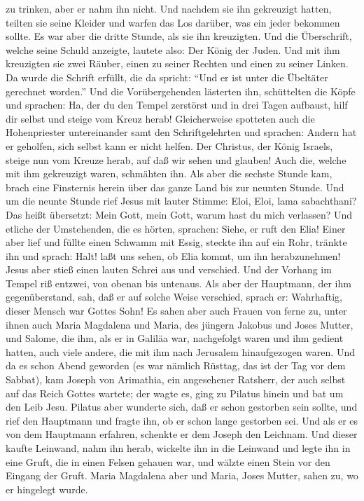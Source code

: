 zu trinken, aber er nahm ihn nicht.  Und nachdem sie ihn
gekreuzigt hatten, teilten sie seine Kleider und warfen das Los darüber,
was ein jeder bekommen sollte.  Es war aber die dritte
Stunde, als sie ihn kreuzigten.  Und die Überschrift,
welche seine Schuld anzeigte, lautete also: Der König der Juden.
 Und mit ihm kreuzigten sie zwei Räuber, einen zu seiner
Rechten und einen zu seiner Linken.  Da wurde die Schrift
erfüllt, die da spricht: ``Und er ist unter die Übeltäter gerechnet
worden.''  Und die Vorübergehenden lästerten ihn,
schüttelten die Köpfe und sprachen:  Ha, der du den
Tempel zerstörst und in drei Tagen aufbaust, hilf dir selbst und steige
vom Kreuz herab!  Gleicherweise spotteten auch die
Hohenpriester untereinander samt den Schriftgelehrten und sprachen:
Andern hat er geholfen, sich selbst kann er nicht helfen.
 Der Christus, der König Israels, steige nun vom Kreuze
herab, auf daß wir sehen und glauben! Auch die, welche mit ihm
gekreuzigt waren, schmähten ihn.  Als aber die sechste
Stunde kam, brach eine Finsternis herein über das ganze Land bis zur
neunten Stunde.  Und um die neunte Stunde rief Jesus mit
lauter Stimme: Eloi, Eloi, lama sabachthani? Das heißt übersetzt: Mein
Gott, mein Gott, warum hast du mich verlassen?  Und
etliche der Umstehenden, die es hörten, sprachen: Siehe, er ruft den
Elia!  Einer aber lief und füllte einen Schwamm mit
Essig, steckte ihn auf ein Rohr, tränkte ihn und sprach: Halt! laßt uns
sehen, ob Elia kommt, um ihn herabzunehmen!  Jesus aber
stieß einen lauten Schrei aus und verschied.  Und der
Vorhang im Tempel riß entzwei, von obenan bis untenaus. 
Als aber der Hauptmann, der ihm gegenüberstand, sah, daß er auf solche
Weise verschied, sprach er: Wahrhaftig, dieser Mensch war Gottes Sohn!
 Es sahen aber auch Frauen von ferne zu, unter ihnen auch
Maria Magdalena und Maria, des jüngern Jakobus und Joses Mutter, und
Salome,  die ihm, als er in Galiläa war, nachgefolgt
waren und ihm gedient hatten, auch viele andere, die mit ihm nach
Jerusalem hinaufgezogen waren.  Und da es schon Abend
geworden (es war nämlich Rüsttag, das ist der Tag vor dem Sabbat),
 kam Joseph von Arimathia, ein angesehener Ratsherr, der
auch selbst auf das Reich Gottes wartete; der wagte es, ging zu Pilatus
hinein und bat um den Leib Jesu.  Pilatus aber wunderte
sich, daß er schon gestorben sein sollte, und rief den Hauptmann und
fragte ihn, ob er schon lange gestorben sei.  Und als er
es von dem Hauptmann erfahren, schenkte er dem Joseph den Leichnam.
 Und dieser kaufte Leinwand, nahm ihn herab, wickelte ihn
in die Leinwand und legte ihn in eine Gruft, die in einen Felsen gehauen
war, und wälzte einen Stein vor den Eingang der Gruft. 
Maria Magdalena aber und Maria, Joses\textquotesingle{} Mutter, sahen
zu, wo er hingelegt wurde.

